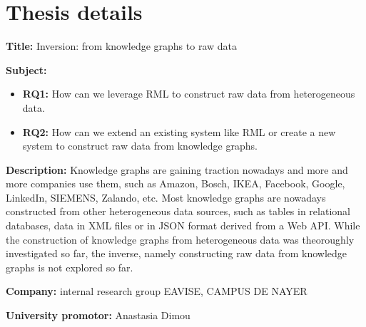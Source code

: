 
\chapter{Thesis details}

\textbf{Title: } Inversion: from knowledge graphs to raw data

\textbf{Subject: } 
\begin{itemize}
	\item \textbf{RQ1: } How can we leverage RML to construct raw data from heterogeneous data.
	\item \textbf{RQ2: } How can we extend an existing system like RML or create a new system to construct raw data from knowledge graphs.
\end{itemize}

\textbf{Description: } Knowledge graphs are gaining traction nowadays and more and more companies use them, such as Amazon, Bosch, IKEA, Facebook, Google, LinkedIn, SIEMENS, Zalando, etc. Most knowledge graphs are nowadays constructed from other heterogeneous data sources, such as tables in relational databases, data in XML files or in JSON format derived from a Web API. While the construction of knowledge graphs from heterogeneous data was theoroughly investigated so far, the inverse, namely constructing raw data from knowledge graphs is not explored so far.

\textbf{Company: } internal research group EAVISE, CAMPUS DE NAYER

\textbf{University promotor: } Anastasia Dimou
